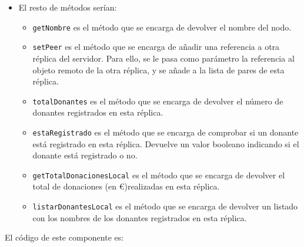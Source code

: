\documentclass[a4paper,12pt]{article}
\begin{document}
\begin{itemize}
\begin{itemize}
						\item \texttt{getTotalDonacionesDonante} es el método que se encarga de devolver el total donado por un donante concreto. Para ello, primero comprueba si el donante está registrado en el sistema, y si lo está, devuelve el total de donaciones local de ese donante.
						\item \texttt{mayorDonanteGlobal} es el método que se encarga de devolver el nombre del donante que más ha donado en todo el sistema. Para ello, recorre la lista de donantes de esta réplica y de las otras réplicas para encontrar el donante con mayor total de donaciones.
						\item \texttt{obtenerHistorialDonaciones} es el método que se encarga de devolver el historial de donaciones de un donante concreto. Para ello, primero comprueba si el donante está registrado en el sistema, y si lo está, devuelve la lista de todas las cantidades que ha ido donando.
					\end{itemize}\item El resto de métodos serían:
					\begin{itemize}
						\item \texttt{getNombre} es el método que se encarga de devolver el nombre del nodo.
						\item \texttt{setPeer} es el método que se encarga de añadir una referencia a otra réplica del servidor. Para ello, se le pasa como parámetro la referencia al objeto remoto de la otra réplica, y se añade a la lista de pares de esta réplica.
						\item \texttt{totalDonantes} es el método que se encarga de devolver el número de donantes registrados en esta réplica.
						\item \texttt{estaRegistrado} es el método que se encarga de comprobar si un donante está registrado en esta réplica. Devuelve un valor booleano indicando si el donante está registrado o no.
						\item \texttt{getTotalDonacionesLocal} es el método que se encarga de devolver el total de donaciones (en €)realizadas en esta réplica.
						\item \texttt{listarDonantesLocal} es el método que se encarga de devolver un listado con los nombres de los donantes registrados en esta réplica.
					\end{itemize}
				\end{itemize}
				
				El código de este componente es:
				
				\inputminted[linenos, frame=lines, fontsize=\scriptsize]{Java}{../codigo/Parte_2_Servidor_Replicado/Donacion.java}					 
\end{document}
